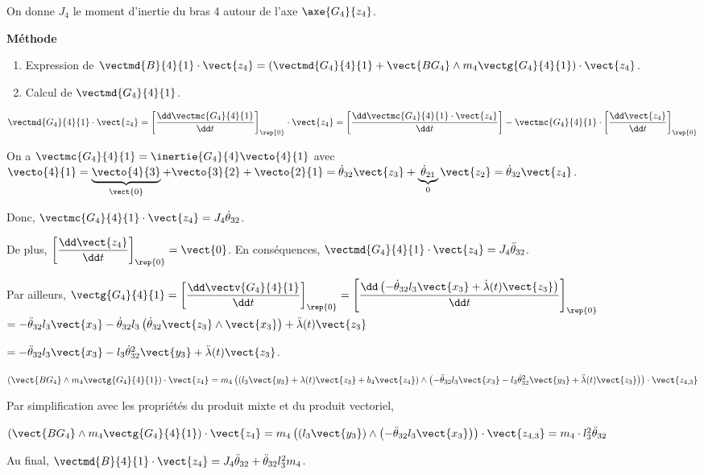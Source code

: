 \ifprof
\begin{corrige}
On donne $J_4$ le moment d'inertie du bras 4 autour de l'axe $\axe{G_4}{z_4}$.

\textbf{Méthode}
\begin{enumerate}
\item Expression de $\vectmd{B}{4}{1}\cdot\vect{z_4} = \left( \vectmd{G_4}{4}{1} + \vect{BG_4}\wedge m_4 \vectg{G_4}{4}{1}\right)\cdot\vect{z_4}$.
\item Calcul de $\vectmd{G_4}{4}{1}$.
\end{enumerate}

$\vectmd{G_4}{4}{1} \cdot\vect{z_4} = \left[ \dfrac{\dd \vectmc{G_4}{4}{1}}{\dd t} \right]_{\rep{0}}\cdot\vect{z_4}
=\left[ \dfrac{\dd \vectmc{G_4}{4}{1}\cdot \vect{z_4}}{\dd t} \right]-\vectmc{G_4}{4}{1}\cdot\left[ \dfrac{\dd \vect{z_4}}{\dd t} \right]_{\rep{0}}$



On a $\vectmc{G_4}{4}{1} =\inertie{G_4}{4} \vecto{4}{1}$ avec $\vecto{4}{1}=\underbrace{\vecto{4}{3}}_{\vect{0}}+\vecto{3}{2}+\vecto{2}{1} =\dot{\theta}_{32} \vect{z_3}+\underbrace{\dot{\theta}_{21}}_{0} \vect{z_2}=\dot{\theta}_{32} \vect{z_4}$.

Donc,
$\vectmc{G_4}{4}{1}\cdot\vect{z_4}=J_4\dot{\theta}_{32} $.

De plus, $ \left[ \dfrac{ \dd \vect{z_4}}{\dd t} \right]_{\rep{0}} = \vect{0} $. 
En conséquences, $\vectmd{G_4}{4}{1} \cdot\vect{z_4}  = J_4\ddot{\theta}_{32}$.

Par ailleurs, $\vectg{G_4}{4}{1}= \left[\dfrac{\dd \vectv{G_4}{4}{1}}{\dd t} \right]_{\rep{0}}=\left[\dfrac{\dd \left( -\dot{\theta}_{32}l_3\vect{x_3}  + \dot{\lambda}(t)\vect{z_3} \right)}{\dd t} \right]_{\rep{0}}$
$= -\ddot{\theta}_{32}l_3\vect{x_3} -\dot{\theta}_{32}l_3    \left(\dot{\theta}_{32} \vect{z_3}\wedge \vect{x_3} \right)  + \ddot{\lambda}(t)\vect{z_3}  $

$= -\ddot{\theta}_{32}l_3\vect{x_3} -l_3   \dot{\theta}_{32}^2  \vect{y_3} + \ddot{\lambda}(t)\vect{z_3}  $.

$\left(\vect{BG_4}\wedge m_4 \vectg{G_4}{4}{1}\right)\cdot\vect{z_4} = 
m_4\left( \left(l_3 \vect{y_3} + \lambda(t) \vect{z_3}+ b_4 \vect{z_4}\right) \wedge  \left(-\ddot{\theta}_{32}l_3\vect{x_3} -l_3   \dot{\theta}_{32}^2  \vect{y_3} + \ddot{\lambda}(t)\vect{z_3} \right) \right)\cdot \vect{z_{4,3}}$

Par simplification avec les propriétés du produit mixte et du produit vectoriel,

$
\left(\vect{BG_4}\wedge m_4 \vectg{G_4}{4}{1}\right)\cdot\vect{z_4} =
m_4\left( \left(l_3 \vect{y_3} \right) \wedge  \left(-\ddot{\theta}_{32}l_3\vect{x_3} \right) \right)\cdot \vect{z_{4,3}}
=m_4\cdot l_3^2\ddot{\theta}_{32}
$


  Au final,  $\vectmd{B}{4}{1}\cdot\vect{z_4} = J_4 \ddot{\theta}_{32}+\ddot{\theta}_{32}l_3^2 m_4 $.

\end{corrige}
